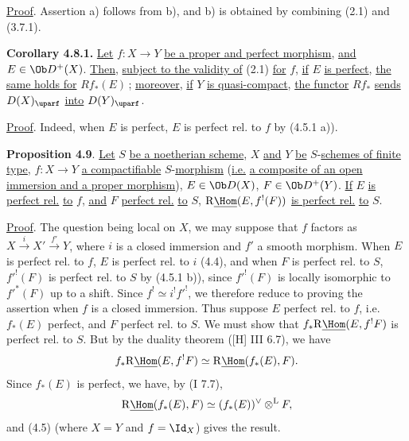 \uline{Proof}. Assertion a) follows from b), and b) is obtained by combining (2.1) and (3.7.1).

\textbf{Corollary 4.8.1.} \uline{Let} \(f:X\to Y\) \uline{be a proper and perfect morphism}, \uline{and} \(E\in\Ob D^+(X)\). \uline{Then}, \uline{subject to the validity of} (2.1) \uline{for} \(f\), \uline{if} \(E\) \uline{is perfect}, \uline{the same holds for} \(Rf_*(E)\)\,; \uline{moreover}, \uline{if} \(Y\) \uline{is quasi-compact}, \uline{the functor} \(Rf_*\) \uline{sends} \(D(X)_{\uparf}\) \uline{into} \(D(Y)_{\uparf}\).

\uline{Proof}. Indeed, when \(E\) is perfect, \(E\) is perfect rel. to \(f\) by (4.5.1 a)).

\textbf{Proposition 4.9}. \uline{Let} \(S\) \uline{be a noetherian scheme}, \(X\) \uline{and} \(Y\) \uline{be} \(S\)-\uline{schemes of finite type}, \(f:X\to Y\) \uline{a compactifiable} \(S\)-\uline{morphism} (\uline{i.e.} \uline{a composite of an open immersion and a proper morphism}), \(E\in\Ob D(X)\), \(F\in\Ob D^+(Y)\). \uline{If} \(E\) \uline{is perfect rel.} \uline{to} \(f\), \uline{and} \(F\) \uline{perfect rel.} \uline{to} \(S\), \(\mathrm R\underline{\Hom}(E,f^!(F))\) \uline{is perfect rel.} \uline{to} \(S\).

\uline{Proof}. The question being local on \(X\), we may suppose that \(f\) factors as \(X\xrightarrow{i}X'\xrightarrow{f'}Y\), where \(i\) is a closed immersion and \(f'\) a smooth morphism. When \(E\) is perfect rel. to \(f\), \(E\) is perfect rel. to \(i\) (4.4), and when \(F\) is perfect rel. to \(S\), \(f'^!(F)\) is perfect rel. to \(S\) by (4.5.1 b)), since \(f'^!(F)\) is locally isomorphic to \(f'^*(F)\) up to a shift. Since \(f^!\simeq i^!f'^!\), we therefore reduce to proving the assertion when \(f\) is a closed immersion. Thus suppose \(E\) perfect rel. to \(f\), i.e. \(f_*(E)\) perfect, and \(F\) perfect rel. to \(S\). We must show that \(f_*\mathrm R\underline{\Hom}(E,f^!F)\) is
%
perfect rel. to \(S\). But by the duality theorem ([H] III 6.7), we have
\[
 f_*\mathrm R\underline{\Hom}(E,f^!F)\simeq\mathrm R\underline{\Hom}(f_*(E),F).
\]
Since \(f_*(E)\) is perfect, we have, by (I 7.7),
\[
 \mathrm R\underline{\Hom}(f_*(E),F)\simeq(f_*(E))^{\vee}\otimes^{\mathrm L}F,
\]
and (4.5) (where \(X=Y\) and \(f=\Id_X\)) gives the result.

